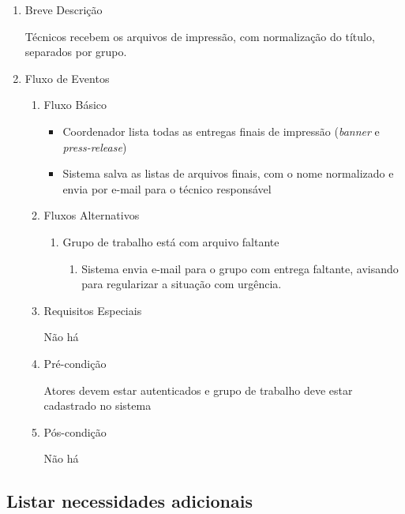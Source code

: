 \begin{enumerate}
    \item Breve Descrição


Técnicos recebem os arquivos de impressão, com normalização do título, separados por grupo.


    \item Fluxo de Eventos

\begin{enumerate}
    \item Fluxo Básico

\begin{itemize}
    \item Coordenador lista todas as entregas finais de impressão (\textit{banner} e \textit{press-release})

    \item Sistema salva as listas de arquivos finais, com o nome normalizado e envia por e-mail para o técnico responsável
\end{itemize}

    \item Fluxos Alternativos

\begin{enumerate}
    \item Grupo de trabalho está com arquivo faltante

\begin{enumerate}
    \item Sistema envia e-mail para o grupo com entrega faltante, avisando para regularizar a situação com urgência.
\end{enumerate}
\end{enumerate}

    \item Requisitos Especiais


Não há


    \item Pré-condição


Atores devem estar autenticados e grupo de trabalho deve estar cadastrado no sistema


    \item Pós-condição

    Não há
\end{enumerate}
\end{enumerate}

\subsection{Listar necessidades adicionais}


